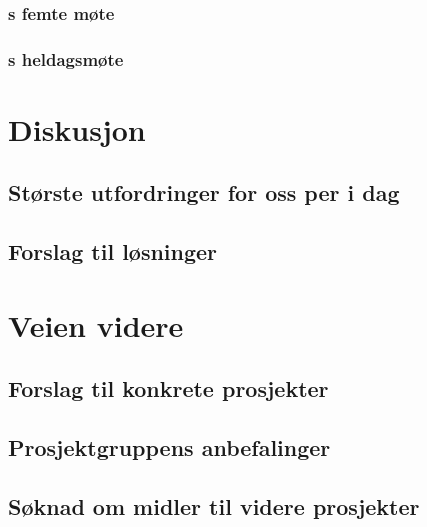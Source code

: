 \documentclass[11pt]{report} %
\begin{document}
                  \subsection{s femte møte}\label{sec:agr_5}

                  \subsection{s heldagsmøte}\label{sec:agr_6}
                    

              \chapter{Diskusjon}\label{chap:disk}
                \section{Største utfordringer for oss per i dag} \label{chap:disk_utf}

                \section{Forslag til løsninger}\label{chap:disk_losn}

              \chapter{Veien videre}\label{chap:vvidere}
                \section{Forslag til konkrete prosjekter}\label{chap:vvidere_konkpr}
                \section{Prosjektgruppens anbefalinger}\label{chap:vvidere_anbef}
                \section{Søknad om midler til videre prosjekter}\label{chap:vvidere_soknmid}
\end{document}
